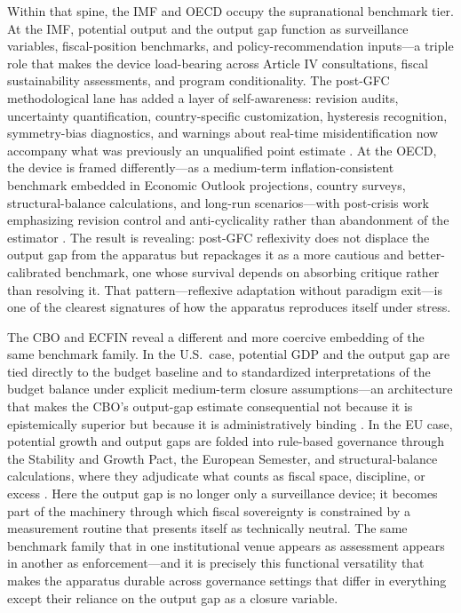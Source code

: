 \documentclass[11pt,a4paper]{article}
\begin{document}
Within that spine, the IMF and OECD occupy the supranational benchmark tier. At
the IMF, potential output and the output gap function as surveillance variables,
fiscal-position benchmarks, and policy-recommendation inputs---a triple role that
makes the device load-bearing across Article IV consultations, fiscal
sustainability assessments, and program conditionality. The post-GFC
methodological lane has added a layer of self-awareness: revision audits,
uncertainty quantification, country-specific customization, hysteresis
recognition, symmetry-bias diagnostics, and warnings about real-time
misidentification now accompany what was previously an unqualified point estimate
\citep{BarkemaGudmundssonMrkaic2020,CerraSaxena2017,CerraFatasSaxena2023,%
	AiyarVoigts2024}. At the OECD, the device is framed differently---as a
medium-term inflation-consistent benchmark embedded in Economic Outlook
projections, country surveys, structural-balance calculations, and long-run
scenarios---with post-crisis work emphasizing revision control and
anti-cyclicality rather than abandonment of the estimator
\citep{TorresMartin1990}. The result is revealing: post-GFC reflexivity does not
displace the output gap from the apparatus but repackages it as a more cautious
and better-calibrated benchmark, one whose survival depends on absorbing critique
rather than resolving it. That pattern---reflexive adaptation without paradigm
exit---is one of the clearest signatures of how the apparatus reproduces itself
under stress.



The CBO and ECFIN reveal a different and more coercive embedding of the same
benchmark family. In the U.S.\ case, potential GDP and the output gap are tied
directly to the budget baseline and to standardized interpretations of the budget
balance under explicit medium-term closure assumptions---an architecture that
makes the CBO's output-gap estimate consequential not because it is epistemically
superior but because it is administratively binding
\citep{CBO2004PotentialGDP}. In the EU case, potential growth and output gaps are
folded into rule-based governance through the Stability and Growth Pact, the
European Semester, and structural-balance calculations, where they adjudicate what
counts as fiscal space, discipline, or excess \citep{HavikEtAl2014}. Here the
output gap is no longer only a surveillance device; it becomes part of the
machinery through which fiscal sovereignty is constrained by a measurement routine
that presents itself as technically neutral. The same benchmark family that in one
institutional venue appears as assessment appears in another as
enforcement---and it is precisely this functional versatility that makes the
apparatus durable across governance settings that differ in everything except
their reliance on the output gap as a closure variable.
\end{document}
